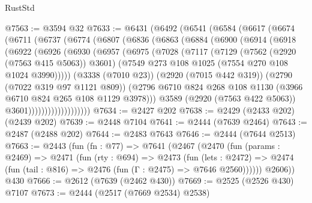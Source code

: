 \begin{lexlean}{RustStd}
\begin{coremodule}
@7563 := @3594 @32
@7633 := @6431
    (@6492
      (@6541
        (@6584
          (@6617
            (@6674
              (@6711
                (@6737
                  (@6774
                    (@6807
                      (@6836
                        (@6863
                          (@6884
                            (@6900
                              (@6914
                                (@6918
                                  (@6922
                                    (@6926
                                      (@6930
                                        (@6957
                                          (@6975
                                            (@7028
                                              (@7117
                                                (@7129
                                                  (@7562 (@2920 (@7563 @415 @5063)) @3601)
                                                  (@7549
                                                    @273
                                                    @108
                                                    @1025
                                                    (@7554 @270 @108 @1024 @3990)))))
                                            (@3338 (@7010 @23))
                                            (@2920 (@7015 @442 @319))
                                            (@2790 (@7022 @319 @97 @1121 @809))
                                            (@2796
                                              @6710
                                              @824
                                              @268
                                              @108
                                              @1130
                                              (@3966 @6710 @824 @265 @108 @1129 @3978)))
                                          @3589
                                          (@2920 (@7563 @422 @5063))
                                          @3601)))))))))))))))))))
@7634 := @2427 @202
@7638 := @2429 (@2433 @202) (@2439 @202)
@7639 := @2448 @7104
@7641 := @2444 (@7639 @2464)
@7643 := @2487 (@2488 @202)
@7644 := @2483 @7643
@7646 := @2444 (@7644 @2513)
@7663 := @2443
    (fun (fn : @77) =>
    @7641
      (@2467
        (@2470
          (fun (params : @2469) =>
          @2471
            (fun (rty : @694) =>
            @2473
              (fun (lets : @2472) =>
              @2474 (fun (tail : @816) => @2476 (fun (Γ : @2475) => @7646 @2560))))))
        @2606))
    @430
@7666 := @2612 (@7639 (@2462 @430))
@7669 := @2525 (@2526 @430) @7107
@7673 := @2444 (@2517 (@7669 @2534) @2538)

\end{coremodule}
\end{lexlean}
